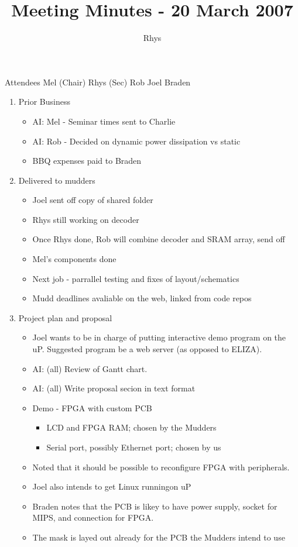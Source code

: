 \documentclass{article}
\begin{document}
\author{Rhys}
\title{Meeting Minutes - 20 March 2007}
\maketitle
\begin{flushleft}

Attendees
Mel (Chair)
Rhys (Sec)
Rob
Joel
Braden
\newline

\begin{enumerate}
  \item Prior Business
    \begin{itemize}
    \item AI: Mel - Seminar times sent to Charlie
    \item AI: Rob -  Decided on dynamic power dissipation vs static
    \item BBQ expenses paid to Braden
    \end{itemize}

  \item Delivered to mudders 
    \begin{itemize}
    \item Joel sent off copy of shared folder 
    \item Rhys still working on decoder
    \item Once Rhys done, Rob will combine decoder and SRAM array, send off
    \item Mel's components done
    \item Next job - parrallel testing and fixes of layout/schematics
    \item Mudd deadlines avaliable on the web, linked from code repos
    \end{itemize}

  \item Project plan and proposal 
    \begin{itemize}
      \item Joel wants to be in charge of putting interactive demo program
            on the uP. Suggested program be a web server (as opposed to 
            ELIZA).
      \item AI: (all) Review of Gantt chart.
      \item AI: (all) Write proposal secion in text format
      \item Demo - FPGA with custom PCB
      \begin{itemize}
        \item LCD and FPGA RAM; chosen by the Mudders
        \item Serial port, possibly Ethernet port; chosen by us
      \end{itemize}
      \item Noted that it should be possible to reconfigure FPGA with
            peripherals.
      \item Joel also intends to get Linux runningon uP
      \item Braden notes that the PCB is likey to have power supply,
            socket for MIPS, and connection for FPGA.
      \item The mask is layed out already for the PCB the Mudders intend to use
    \end{itemize}


\end{enumerate}
\end{flushleft}
\end{document}
